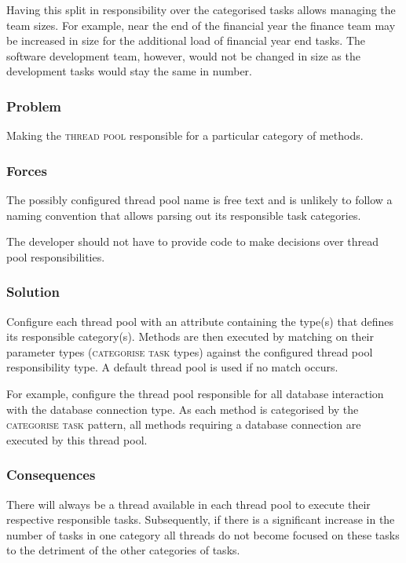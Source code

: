 \documentclass[prodmode]{style/acmlarge}
\begin{document}
Having this split in responsibility over the categorised tasks allows managing
the team sizes.  For example, near the end of the financial year the finance
team may be increased in size for the additional load of financial year end
tasks.  The software development team, however, would not be changed in size as
the development tasks would stay the same in number.

\subsubsection*{Problem} Making the \textsc{thread pool} responsible for a
particular category of methods.

\subsubsection*{Forces} The possibly configured thread pool name is free text
and is unlikely to follow a naming convention that allows parsing out its
responsible task categories.

The developer should not have to provide code to make decisions over thread pool
responsibilities.

\subsubsection*{Solution} Configure each thread pool with an attribute
containing the type(s) that defines its responsible category(s).  Methods are
then executed by matching on their parameter types (\textsc{categorise task}
types) against the configured thread pool responsibility type.  A default thread
pool is used if no match occurs.

For example, configure the thread pool responsible for all database interaction
with the database connection type.  As each method is categorised by the
\textsc{categorise task} pattern, all methods requiring a database connection
are executed by this thread pool.

\subsubsection*{Consequences} There will always be a thread available in each
thread pool to execute their respective responsible tasks.  Subsequently, if
there is a significant increase in the number of tasks in one category all
threads do not become focused on these tasks to the detriment of the other
categories of tasks.
\end{document}
